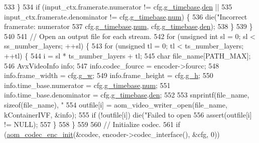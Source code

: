 \begin{DoxyCodeInclude}
{{{{{{{{{{{{{{{533     \}
534     \textcolor{keywordflow}{if} (input\_ctx.framerate.numerator != cfg.\hyperlink{structaom__codec__enc__cfg_a10664f1fc5b6ec29b77ee13efeeecdf7}{g\_timebase}.\hyperlink{structaom__rational_adeddf2ea01c12b7be66536e0a0fb92c5}{den} ||
535         input\_ctx.framerate.denominator != cfg.\hyperlink{structaom__codec__enc__cfg_a10664f1fc5b6ec29b77ee13efeeecdf7}{g\_timebase}.\hyperlink{structaom__rational_a7b48174411798c780a15f132c4650839}{num}) \{
536       die(\textcolor{stringliteral}{"Incorrect framerate: numerator %
537           cfg.\hyperlink{structaom__codec__enc__cfg_a10664f1fc5b6ec29b77ee13efeeecdf7}{g\_timebase}.\hyperlink{structaom__rational_a7b48174411798c780a15f132c4650839}{num}, cfg.\hyperlink{structaom__codec__enc__cfg_a10664f1fc5b6ec29b77ee13efeeecdf7}{g\_timebase}.\hyperlink{structaom__rational_adeddf2ea01c12b7be66536e0a0fb92c5}{den});
538     \}
539   \}
540 
541   \textcolor{comment}{// Open an output file for each stream.}
542   \textcolor{keywordflow}{for} (\textcolor{keywordtype}{unsigned} \textcolor{keywordtype}{int} sl = 0; sl < ss\_number\_layers; ++sl) \{
543     \textcolor{keywordflow}{for} (\textcolor{keywordtype}{unsigned} tl = 0; tl < ts\_number\_layers; ++tl) \{
544       i = sl * ts\_number\_layers + tl;
545       \textcolor{keywordtype}{char} file\_name[PATH\_MAX];
546       AvxVideoInfo info;
547       info.codec\_fourcc = encoder->fourcc;
548       info.frame\_width = cfg.\hyperlink{structaom__codec__enc__cfg_a80cb459c5ef3c7e1516f617c4c9d6eab}{g\_w};
549       info.frame\_height = cfg.\hyperlink{structaom__codec__enc__cfg_a37b0f57b63bec8d133df8901d4407ee6}{g\_h};
550       info.time\_base.numerator = cfg.\hyperlink{structaom__codec__enc__cfg_a10664f1fc5b6ec29b77ee13efeeecdf7}{g\_timebase}.\hyperlink{structaom__rational_a7b48174411798c780a15f132c4650839}{num};
551       info.time\_base.denominator = cfg.\hyperlink{structaom__codec__enc__cfg_a10664f1fc5b6ec29b77ee13efeeecdf7}{g\_timebase}.\hyperlink{structaom__rational_adeddf2ea01c12b7be66536e0a0fb92c5}{den};
552 
553       snprintf(file\_name, \textcolor{keyword}{sizeof}(file\_name), \textcolor{stringliteral}{"%
554       outfile[i] = aom\_video\_writer\_open(file\_name, kContainerIVF, &info);
555       \textcolor{keywordflow}{if} (!outfile[i]) die(\textcolor{stringliteral}{"Failed to open %
556       assert(outfile[i] != NULL);
557     \}
558   \}
559 
560   \textcolor{comment}{// Initialize codec.}
561   \textcolor{keywordflow}{if} (\hyperlink{group__encoder_gaade68a7d33d30f97dc9a596aa5e065d8}{aom\_codec\_enc\_init}(&codec, encoder->codec\_interface(), &cfg, 0))
}}}}}}}}}}}}}}}}}}
\end{DoxyCodeInclude}
